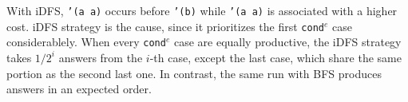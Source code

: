 \documentclass[format=acmlarge, review=true, authordraft=true]{acmart}
\newcommand{\conde}{\texttt{cond$^e$} }
\begin{document}
\begin{center}
  \begin{tabular}{c}
   
   \end{tabular}
\end{center}

With iDFS, \texttt{'(a a)} occurs before \texttt{'(b)} while \texttt{'(a a)} is 
associated with a higher cost. iDFS strategy is the cause, since it prioritizes 
the first \conde case considerablely. When every \conde case 
are equally productive, the iDFS strategy takes $1/2^{i}$ answers from the 
$i$-th case, except the last case, which share the same portion as the second 
last one. In contrast, the same run with BFS produces answers in an expected 
order.

\begin{center}
  \begin{tabular}{c}
   
   \end{tabular}
\end{center}


% 
% 
% 
% 
% 
%   
 
\end{document}
